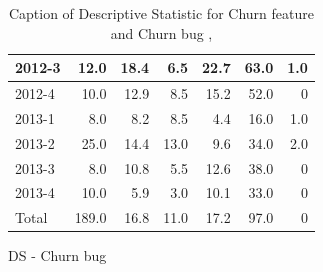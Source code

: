 \documentclass[UKenglish]{ifimaster}  %
\begin{document}
\begin{appendices}
\begin{table}[!htbp]
\begin{adjustwidth}{-1.5cm}{}
\begin{subfigure}[b]{0.3\textwidth}
{\begin{tabular}{ | l | r | r | r | r | r | r | }
2012-3 & 12.0 & 18.4 & 6.5 & 22.7 & 63.0 & 1.0\\ \hline
2012-4 & 10.0 & 12.9 & 8.5 & 15.2 & 52.0 & 0\\ \hline
2013-1 & 8.0 & 8.2 & 8.5 & 4.4 & 16.0 & 1.0\\ \hline
2013-2 & 25.0 & 14.4 & 13.0 & 9.6 & 34.0 & 2.0\\ \hline
2013-3 & 8.0 & 10.8 & 5.5 & 12.6 & 38.0 & 0\\ \hline
2013-4 & 10.0 & 5.9 & 3.0 & 10.1 & 33.0 & 0\\ \hline
Total & 189.0 & 16.8 & 11.0 & 17.2 & 97.0 & 0\\ \hline
\end{tabular}
}
\caption{DS - Churn bug}
\label{DS:CB:1}
\end{subfigure}
\end{adjustwidth}
\caption[Optional caption for list of figures]{Caption of Descriptive Statistic for Churn feature and Churn bug  , }
\label{DS:1:4} %
\end{table}






\end{appendices}
\end{document}
